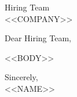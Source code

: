 \documentclass[a4paper,10pt]{letter}
\begin{document}
\begin{letter}{Hiring Team\\<<COMPANY>>}

\opening{Dear Hiring Team,}

<<BODY>>

\raggedright
Sincerely,\\
<<NAME>>

\end{letter}
\end{document}
